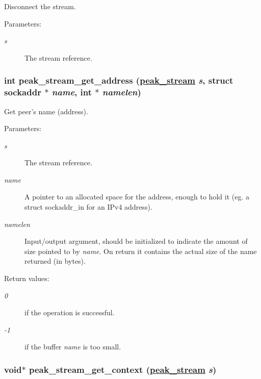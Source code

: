 Disconnect the stream. 

\begin{Desc}
\item[Parameters:]
\begin{description}
\item[{\em s}]The stream reference. \end{description}
\end{Desc}
\hypertarget{group__stream__common_ga5}{
\subsubsection[peak\_\-stream\_\-get\_\-address]{\setlength{\rightskip}{0pt plus 5cm}int peak\_\-stream\_\-get\_\-address (\hyperlink{group__stream_ga0}{peak\_\-stream} {\em s}, struct sockaddr $\ast$ {\em name}, int $\ast$ {\em namelen})}}
\label{group__stream__common_ga5}


Get peer's name (address). 

\begin{Desc}
\item[Parameters:]
\begin{description}
\item[{\em s}]The stream reference. \item[{\em name}]A pointer to an allocated space for the address, enough to hold it (eg. a struct sockaddr\_\-in for an IPv4 address). \item[{\em namelen}]Input/output argument, should be initialized to indicate the amount of size pointed to by {\em name\/}. On return it contains the actual size of the name returned (in bytes).\end{description}
\end{Desc}
\begin{Desc}
\item[Return values:]
\begin{description}
\item[{\em 0}]if the operation is successful. \item[{\em -1}]if the buffer {\em name\/} is too small. \end{description}
\end{Desc}
\hypertarget{group__stream__common_ga9}{
\subsubsection[peak\_\-stream\_\-get\_\-context]{\setlength{\rightskip}{0pt plus 5cm}void$\ast$ peak\_\-stream\_\-get\_\-context (\hyperlink{group__stream_ga0}{peak\_\-stream} {\em s})}}
\label{group__stream__common_ga9}


